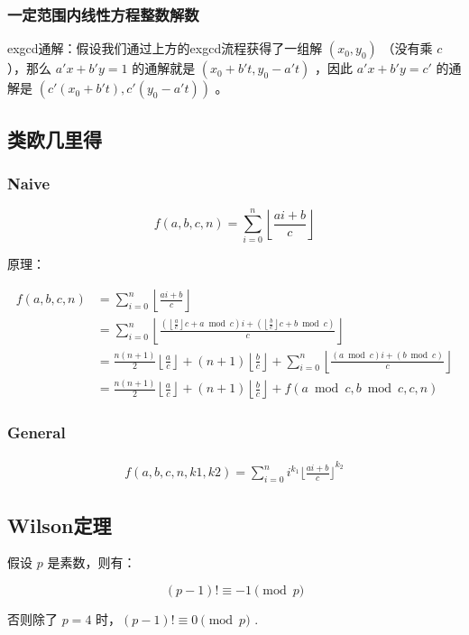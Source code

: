 \documentclass{article}
\begin{document}
\subsubsection{一定范围内线性方程整数解数}
exgcd通解：假设我们通过上方的exgcd流程获得了一组解 $(x_0,y_0)$ （没有乘 $c$ ），那么 $a'x+b'y=1$ 的通解就是 $(x_0+b't,y_0-a't)$ ，因此 $a'x+b'y=c'$ 的通解是 $(c'(x_0+b't),c'(y_0-a't))$ 。

\subsection{类欧几里得}
\subsubsection{Naive}
$$
f(a,b,c,n)=\sum_{i=0}^n\left\lfloor \frac{ai+b}{c} \right\rfloor
$$

原理：

$$
\begin{aligned}
f(a,b,c,n)&=\sum_{i=0}^n\left\lfloor \frac{ai+b}{c} \right\rfloor\\
&=\sum_{i=0}^n\left\lfloor
\frac{\left(\left\lfloor\frac{a}{c}\right\rfloor c+a\bmod c\right)i+\left(\left\lfloor\frac{b}{c}\right\rfloor c+b\bmod c\right)}{c}\right\rfloor\\
&=\frac{n(n+1)}{2}\left\lfloor\frac{a}{c}\right\rfloor+(n+1)\left\lfloor\frac{b}{c}\right\rfloor+
\sum_{i=0}^n\left\lfloor\frac{\left(a\bmod c\right)i+\left(b\bmod c\right)}{c}
\right\rfloor\\
&=\frac{n(n+1)}{2}\left\lfloor\frac{a}{c}\right\rfloor
+(n+1)\left\lfloor\frac{b}{c}\right\rfloor+f(a\bmod c,b\bmod c,c,n)
\end{aligned}
$$

\subsubsection{General}
$$
\begin{aligned}
f(a,b,c,n,k1,k2)=\sum_{i=0}^{n}i^{k_1}{\lfloor \frac{ai+b}{c} \rfloor}^{k_2}
\end{aligned}
$$


\subsection{Wilson定理}
假设 $p$ 是素数，则有：

$$
(p-1)! \equiv -1 \pmod{p}
$$

否则除了 $p=4$ 时，$(p-1)!\equiv 0 \pmod{p}$ .
\end{document}
